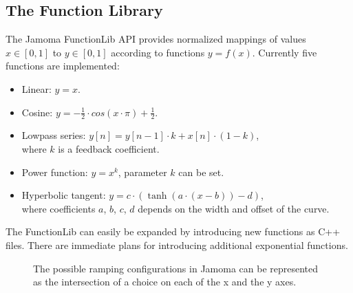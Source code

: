 \documentclass{article}
\begin{document}

\subsection{The Function Library} %
\label{ssec:functionlib}

The Jamoma FunctionLib API provides normalized mappings of values $x \in [0,1]$ to $y \in [0,1]$ according to functions $y = f(x)$. Currently five functions are implemented: 

\begin{itemize}
	\item Linear: $y = x$.
	\item Cosine: $y = - \frac{1}{2} \cdot cos(x \cdot \pi ) + \frac{1}{2} $.
	\item Lowpass series: $y[n] = y[n-1] \cdot k + x[n] \cdot (1-k)$, \\ where $k$ is a feedback coefficient.
	\item Power function: $ y = x^{k} $, parameter $k$ can be set.
	\item Hyperbolic tangent: $ y = c \cdot (\tanh(a\cdot(x-b)) - d) $, \\ where coefficients $a$, $b$, $c$, $d$ depends on the width and offset of the curve.
\end{itemize}

The FunctionLib can easily be expanded by introducing new functions as C++ files. There are immediate plans for introducing additional exponential functions.
 



\begin{figure}
\centerline{}
\caption{The possible ramping configurations in Jamoma can be represented as the intersection of a choice on each of the x and the y axes.}
\label{fig:combinations}
\end{figure}
\end{document}
